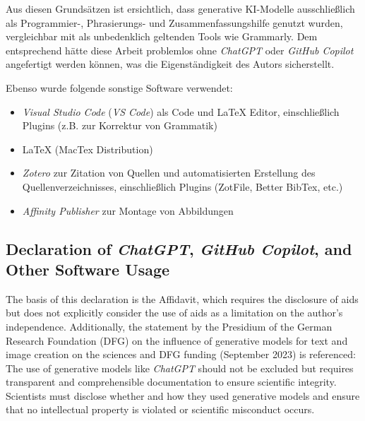 Aus diesen Grundsätzen ist ersichtlich, dass generative KI-Modelle
ausschließlich als Programmier-, Phrasierungs- und Zusammenfassungshilfe genutzt
wurden, vergleichbar mit als unbedenklich geltenden Tools wie Grammarly. Dem
entsprechend hätte diese Arbeit problemlos ohne \textit{ChatGPT} oder \textit{GitHub Copilot}
angefertigt werden können, was die Eigenständigkeit des Autors sicherstellt.

\noindent Ebenso wurde folgende sonstige Software verwendet:
\begin{itemize}
    \item \textit{Visual Studio Code} (\textit{VS Code}) als Code und LaTeX
          Editor, einschließlich Plugins (z.B. zur Korrektur von Grammatik)
    \item LaTeX (MacTex Distribution)
    \item \textit{Zotero} zur Zitation von Quellen und automatisierten Erstellung des
          Quellenverzeichnisses, einschließlich Plugins (ZotFile, Better BibTex, etc.)
    \item \textit{Affinity Publisher} zur Montage von Abbildungen
\end{itemize}



\newpage



\subsection*{Declaration of \textit{ChatGPT}, \textit{GitHub Copilot}, and Other Software Usage}

The basis of this declaration is the Affidavit, which requires the disclosure of
aids but does not explicitly consider the use of aids as a limitation on the
author’s independence. Additionally, the statement by the Presidium of the
German Research Foundation (DFG) on the influence of generative models for text
and image creation on the sciences and DFG funding (September 2023) is
referenced: The use of generative models like \textit{ChatGPT} should not be
excluded but requires transparent and comprehensible documentation to ensure
scientific integrity. Scientists must disclose whether and how they used
generative models and ensure that no intellectual property is violated or
scientific misconduct occurs.

